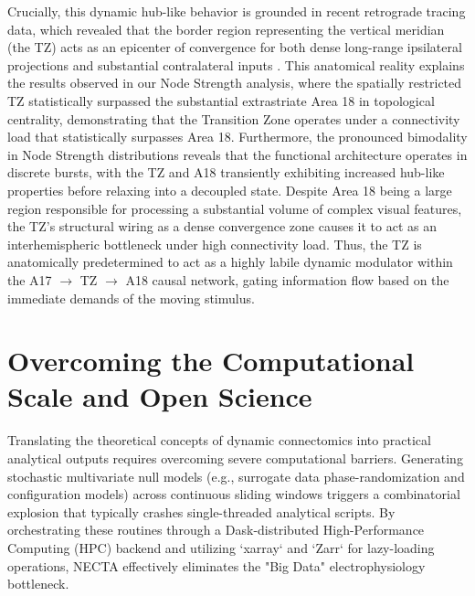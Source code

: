 Crucially, this dynamic hub-like behavior is grounded in recent retrograde tracing data, which revealed that the border region representing the vertical meridian (the TZ) acts as an epicenter of convergence for both dense long-range ipsilateral projections and substantial contralateral inputs \cite{Martin_2024}. This anatomical reality explains the results observed in our Node Strength analysis, where the spatially restricted TZ statistically surpassed the substantial extrastriate Area 18 in topological centrality, demonstrating that the Transition Zone operates under a connectivity load that statistically surpasses Area 18. Furthermore, the pronounced bimodality in Node Strength distributions reveals that the functional architecture operates in discrete bursts, with the TZ and A18 transiently exhibiting increased hub-like properties before relaxing into a decoupled state. Despite Area 18 being a large region responsible for processing a substantial volume of complex visual features, the TZ's structural wiring as a dense convergence zone causes it to act as an interhemispheric bottleneck under high connectivity load. Thus, the TZ is anatomically predetermined to act as a highly labile dynamic modulator within the A17 $\rightarrow$ TZ $\rightarrow$ A18 causal network, gating information flow based on the immediate demands of the moving stimulus.


\section{Overcoming the Computational Scale and Open Science}
Translating the theoretical concepts of dynamic connectomics into practical analytical outputs requires overcoming severe computational barriers. Generating stochastic multivariate null models (e.g., surrogate data phase-randomization and configuration models) across continuous sliding windows triggers a combinatorial explosion that typically crashes single-threaded analytical scripts. 
By orchestrating these routines through a Dask-distributed High-Performance Computing (HPC) backend and utilizing `xarray` and `Zarr` for lazy-loading operations, NECTA effectively eliminates the "Big Data" electrophysiology bottleneck. 

